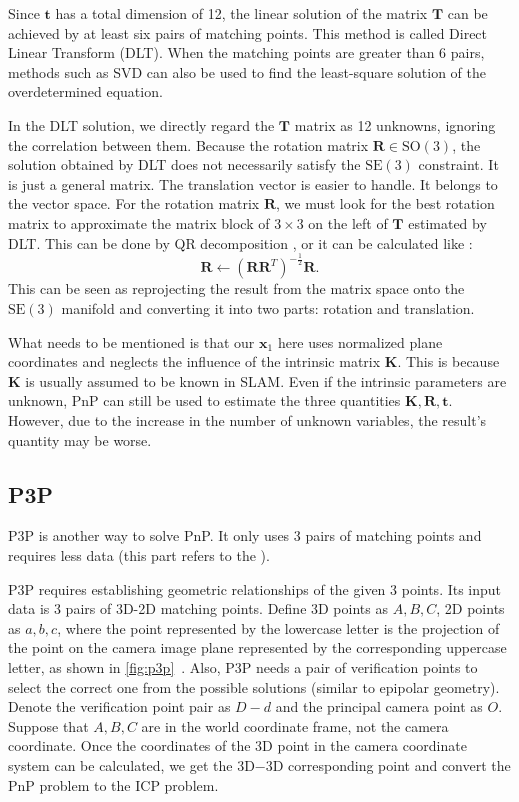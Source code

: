 Since $\mathbf{t}$ has a total dimension of 12, the linear solution of the matrix $\mathbf{T}$ can be achieved by at least six pairs of matching points. This method is called Direct Linear Transform (DLT). When the matching points are greater than 6 pairs, methods such as SVD can also be used to find the least-square solution of the overdetermined equation.

In the DLT solution, we directly regard the $\mathbf{T}$ matrix as 12 unknowns, ignoring the correlation between them. Because the rotation matrix $\mathbf{R} \in \mathrm{SO}(3)$, the solution obtained by DLT does not necessarily satisfy the $\mathrm{SE}(3)$ constraint. It is just a general matrix. The translation vector is easier to handle. It belongs to the vector space. For the rotation matrix $\mathbf{R}$, we must look for the best rotation matrix to approximate the matrix block of $3 \times 3$ on the left of $\mathbf{T}$ estimated by DLT. This can be done by QR decomposition  {\cite{Hartley2003, Chen1994}}, or it can be calculated like {\cite{Barfoot2016,Green1952}}:
\begin{equation}
\mathbf{R} \leftarrow {\left( {\mathbf{R}{\mathbf{R}^T}} \right)^{ - \frac{1}{2}}} \mathbf{R}.
\end{equation}
This can be seen as reprojecting the result from the matrix space onto the $\mathrm{SE}(3)$ manifold and converting it into two parts: rotation and translation.

What needs to be mentioned is that our $\mathbf{x}_1$ here uses normalized plane coordinates and neglects the influence of the intrinsic matrix $\mathbf{K}$. This is because $\mathbf{K}$ is usually assumed to be known in SLAM. Even if the intrinsic parameters are unknown, PnP can still be used to estimate the three quantities $\mathbf{K}, \mathbf{R}, \mathbf{t}$. However, due to the increase in the number of unknown variables, the result's quantity may be worse.

\subsection{P3P}
P3P is another way to solve PnP. It only uses 3 pairs of matching points and requires less data (this part refers to the \cite{web:p3p}).

P3P requires establishing geometric relationships of the given 3 points. Its input data is 3 pairs of 3D-2D matching points. Define 3D points as $A, B, C$, 2D points as $a, b, c$, where the point represented by the lowercase letter is the projection of the point on the camera image plane represented by the corresponding uppercase letter, as shown in \autoref{fig:p3p}~. Also, P3P needs a pair of verification points to select the correct one from the possible solutions (similar to epipolar geometry). Denote the verification point pair as $D-d$ and the principal camera point as $O$. Suppose that $A, B, C$ are in the world coordinate frame, not the camera coordinate. Once the coordinates of the 3D point in the camera coordinate system can be calculated, we get the 3D−3D corresponding point and convert the PnP problem to the ICP problem.

